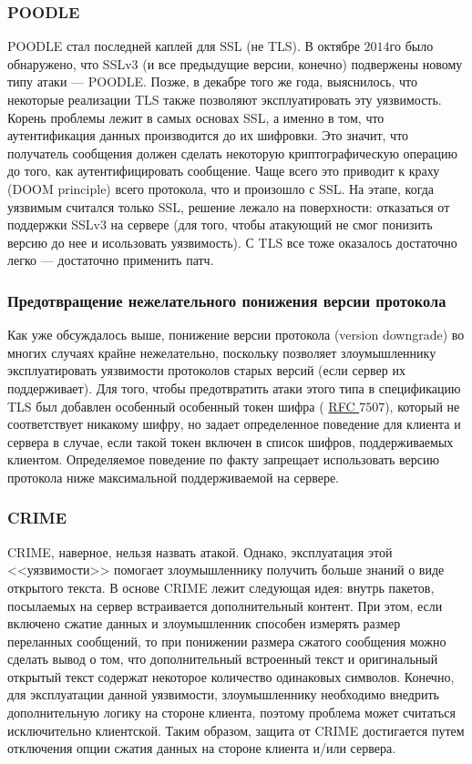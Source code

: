 \subsubsection{POODLE}

POODLE стал последней каплей для SSL (не TLS). В октябре $2014$го было обнаружено, что SSLv3 (и все предыдущие версии, конечно)
подвержены новому типу атаки --- POODLE. Позже, в декабре того же года, выяснилось, что некоторые реализации TLS также позволяют 
эксплуатировать эту уязвимость. Корень проблемы лежит в самых основах SSL, а именно в том, что аутентификация данных производится
до их шифровки. Это значит, что получатель сообщения должен сделать некоторую криптографическую операцию до того, как 
аутентифицировать сообщение. Чаще всего это приводит к краху (DOOM principle) всего протокола, что и произошло с SSL. На этапе,
когда уязвимым считался только SSL, решение лежало на поверхности: отказаться от поддержки SSLv3 на сервере (для того, чтобы 
атакующий не смог понизить версию до нее и исользовать уязвимость). С TLS все тоже оказалось достаточно легко --- достаточно 
применить патч. 

\subsubsection{Предотвращение нежелательного понижения версии протокола}

Как уже обсуждалось выше, понижение версии протокола (version downgrade) во многих случаях крайне нежелательно, поскольку позволяет 
злоумышленнику эксплуатировать уязвимости протоколов старых версий (если сервер их поддерживает). Для того, чтобы предотвратить 
атаки этого типа в спецификацию TLS был добавлен особенный особенный токен шифра  (
\href{https://datatracker.ietf.org/doc/rfc7507/?include_text=1}{RFC $7507$}), который не соответствует никакому шифру, но задает
определенное поведение для клиента и сервера в случае, если такой токен включен в список шифров, поддерживаемых клиентом. 
Определяемое поведение по факту запрещает использовать версию протокола ниже максимальной поддерживаемой на сервере. 

\subsubsection{CRIME}

CRIME, наверное, нельзя назвать атакой. Однако, эксплуатация этой <<уязвимости>> помогает злоумышленнику получить больше знаний о
виде открытого текста. В основе CRIME лежит следующая идея: внутрь пакетов, посылаемых на сервер встраивается дополнительный 
контент. При этом, если включено сжатие данных и злоумышленник способен измерять размер переланных сообщений, то при понижении 
размера сжатого сообщения можно сделать вывод о том, что дополнительный встроенный текст и оригинальный открытый текст содержат
некоторое количество одинаковых символов. Конечно, для эксплуатации данной уязвимости, злоумышленнику необходимо внедрить 
дополнительную логику на стороне клиента, поэтому проблема может считаться исключительно клиентской. Таким образом, защита от 
CRIME достигается путем отключения опции сжатия данных на стороне клиента и/или сервера. 

